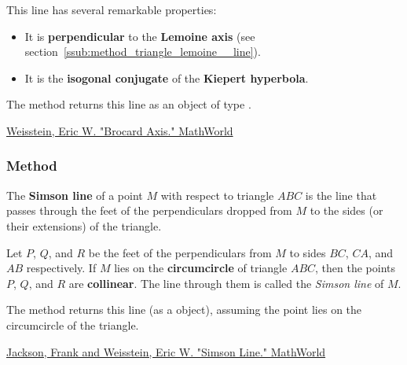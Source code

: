 \medskip
\noindent
This line has several remarkable properties:
\begin{itemize}
  \item It is \textbf{perpendicular} to the \textbf{Lemoine axis} (see section~\ref{ssub:method_triangle_lemoine__line}).
  \item It is the \textbf{isogonal conjugate} of the \textbf{Kiepert hyperbola}.
\end{itemize}

\noindent
The method  returns this line as an object of type .

\begin{flushright}
\small
\href{https://mathworld.wolfram.com/BrocardAxis.html}{Weisstein, Eric W. "Brocard Axis." MathWorld}
\end{flushright}

\vspace{1em}

\subsubsection{Method } %
\label{ssub:method_triangle_simson__line}

The \textbf{Simson line} of a point $M$ with respect to triangle $ABC$ is the line that passes through the feet of the perpendiculars dropped from $M$ to the sides (or their extensions) of the triangle.

\medskip
\noindent
Let $P$, $Q$, and $R$ be the feet of the perpendiculars from $M$ to sides $BC$, $CA$, and $AB$ respectively. If $M$ lies on the \textbf{circumcircle} of triangle $ABC$, then the points $P$, $Q$, and $R$ are \textbf{collinear}. The line through them is called the \emph{Simson line} of $M$.

\medskip
\noindent
The method  returns this line (as a  object), assuming the point  lies on the circumcircle of the triangle.

\begin{flushright}
\small
\href{https://mathworld.wolfram.com/SimsonLine.html}{Jackson, Frank and Weisstein, Eric W. "Simson Line." MathWorld}
\end{flushright}

\vspace{1em}


